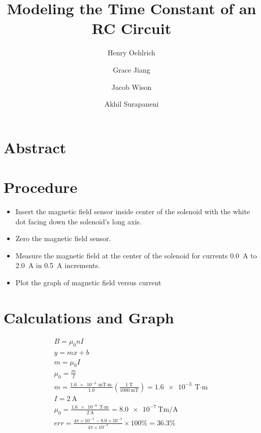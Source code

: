 \documentclass{article}
\title{Modeling the Time Constant of an RC Circuit}
\author{Henry Oehlrich\and Grace Jiang\and Jacob Wison\and Akhil Surapaneni}
\begin{document}
\maketitle

\section{Abstract}

\section{Procedure}

\begin{itemize}
    \item Insert the magnetic field sensor inside center of the solenoid with
        the white dot facing down the solenoid's long axis.
    \item Zero the magnetic field sensor.
    \item Measure the magnetic field at the center of the solenoid for currents
        \SI{0.0}{\ampere} to \SI{2.0}{\ampere} in \SI{0.5}{\ampere} increments.
    \item Plot the graph of magnetic field versus current
\end{itemize}

\section{Calculations and Graph}


\setlength{\jot}{10pt}
\begin{gather}
    B = \mu_0 n I \\
    y = mx + b \\
    m = \mu_0 I \\
    \mu_0 = \frac{m}{I} \\
    m = \frac{\SI{1.6e-3}{\milli\tesla\cdot\meter}}{1.0}
    \left(\frac{\SI{1}{\tesla}}{\SI{1000}{\milli\tesla}}\right) = \SI{1.6e-3}{\tesla\cdot\meter} \\
    I = \SI{2}{\ampere} \\
    \mu_0 = \frac{\SI{1.6e-6}{\tesla\cdot\meter}}{\SI{2}{\ampere}} = \SI{8.0e-7}{\tesla\meter\per\ampere} \\
    err = \frac{4\pi \times 10^{-7}-8.0\times 10^{-7}}{4\pi \times 10^{-7}} \times 100\% = 36.3\%
\end{gather}
\end{document}
